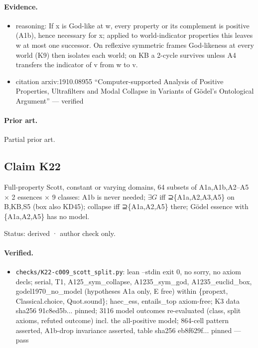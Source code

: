 \documentclass{article}
\begin{document}
\paragraph{Evidence.}
\begin{itemize}
\item reasoning: If x is God-like at w, every property or its complement is positive (A1b), hence necessary for x; applied to world-indicator properties this leaves w at most one successor. On reflexive symmetric frames God-likeness at every world (K9) then isolates each world; on KB a 2-cycle survives unless A4 transfers the indicator of v from w to v.
\item citation arxiv:1910.08955 “Computer-supported Analysis of Positive Properties, Ultrafilters and Modal Collapse in Variants of Gödel’s Ontological Argument” --- verified
\end{itemize}

\paragraph{Prior art.} Partial prior art.

\subsection*{Claim K22}

Full-property Scott, constant or varying domains, 64 subsets of A1a,A1b,A2--A5 $\times$ 2 essences $\times$ 9 classes: A1b is never needed; $\exists G$ iff ⊇\{A1a,A2,A3,A5\} on B,KB,S5 (box also KD45); collapse iff ⊇\{A1a,A2,A5\} there; Gödel essence with \{A1a,A2,A5\} has no model.

Status: derived · author check only.

\paragraph{Verified.}
\begin{itemize}
\item \texttt{checks/K22-c009\_scott\_split.py}: lean --stdin exit 0, no sorry, no axiom decls; serial, T1, A125\_sym\_collapse, A1235\_sym\_god, A1235\_euclid\_box, godel1970\_no\_model (hypotheses A1a only, E free) within \{propext, Classical.choice, Quot.sound\}; haec\_ess, entails\_top axiom-free; K3 data sha256 91c8ed5b... pinned; 3116 model outcomes re-evaluated (class, split axioms, refuted outcome) incl. the all-positive model; 864-cell pattern asserted, A1b-drop invariance asserted, table sha256 eb8f629f... pinned --- pass
\end{itemize}
\end{document}
